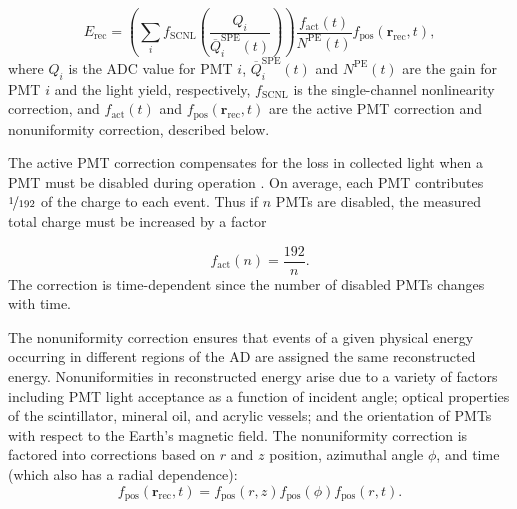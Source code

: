 \begin{equation}
    E_{\text{rec}} = \left(
        \sum_i f_{\text{SCNL}}\left(\frac{Q_i}{\overline{Q}_i^{\text{SPE}}(t)}\right)
    \right)
    \frac{f_{\text{act}}(t)}{N^{\text{PE}}(t)}
    f_{\text{pos}}(\textbf{r}_{\text{rec}},t),
\end{equation}
where $Q_i$ is the ADC value for PMT $i$,
$\overline{Q}_i^{\text{SPE}}(t)$ and $N^{\text{PE}}(t)$
are the gain for PMT $i$ and the light yield, respectively,
$f_{\text{SCNL}}$ is the single-channel nonlinearity correction,
and $f_{\text{act}}(t)$ and $f_{\text{pos}}(\textbf{r}_{\text{rec}},t)$
are the active PMT correction and nonuniformity correction,
described below.

The active PMT correction compensates for the loss in collected light
when a PMT must be disabled during operation \cite{ngd2016}.
On average, each PMT contributes $\nicefrac{1}{192}$ of the charge to each event.
Thus if $n$ PMTs are disabled, the measured total charge must be increased by a factor

\begin{equation}
    f_{\text{act}}(n) = \frac{192}{n}.
\end{equation}
The correction is time-dependent since the number of disabled PMTs changes with time.

The nonuniformity correction ensures that events of a given physical energy
occurring in different regions of the AD
are assigned the same reconstructed energy.
Nonuniformities in reconstructed energy arise due to a variety of factors
including PMT light acceptance as a function of incident angle;
optical properties of the scintillator, mineral oil, and acrylic vessels;
and the orientation of PMTs with respect to the Earth's magnetic field.
The nonuniformity correction is factored into corrections based on
$r$ and $z$ position, azimuthal angle $\phi$, and time
(which also has a radial dependence):
\begin{equation}
    f_{\text{pos}}(\textbf{r}_{\text{rec}},t) =
    f_{\text{pos}}(r, z)f_{\text{pos}}(\phi)f_{\text{pos}}(r, t).
\end{equation}

